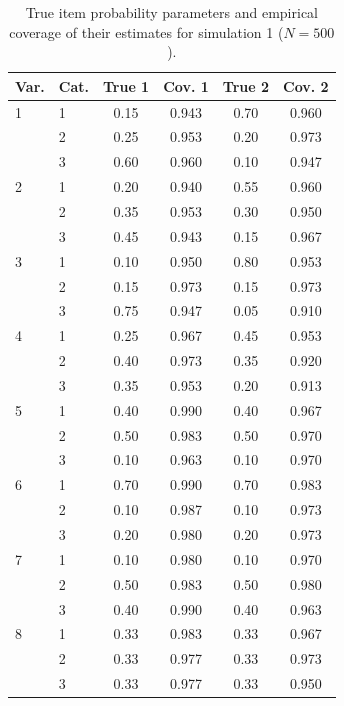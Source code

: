 \begin{table}[H]
\centering
\begin{tabular}{llcccc}
  \toprule
\textbf{Var.} & \textbf{Cat.} & \textbf{True 1} & \textbf{Cov. 1} & \textbf{True 2} & \textbf{Cov. 2} \\ 
  \midrule
1 & 1 & 0.15 & 0.943 & 0.70 & 0.960 \\ 
   & 2 & 0.25 & 0.953 & 0.20 & 0.973 \\ 
   & 3 & 0.60 & 0.960 & 0.10 & 0.947 \\ 
  2 & 1 & 0.20 & 0.940 & 0.55 & 0.960 \\ 
   & 2 & 0.35 & 0.953 & 0.30 & 0.950 \\ 
   & 3 & 0.45 & 0.943 & 0.15 & 0.967 \\ 
  3 & 1 & 0.10 & 0.950 & 0.80 & 0.953 \\ 
   & 2 & 0.15 & 0.973 & 0.15 & 0.973 \\ 
   & 3 & 0.75 & 0.947 & 0.05 & 0.910 \\ 
  4 & 1 & 0.25 & 0.967 & 0.45 & 0.953 \\ 
   & 2 & 0.40 & 0.973 & 0.35 & 0.920 \\ 
   & 3 & 0.35 & 0.953 & 0.20 & 0.913 \\ 
  5 & 1 & 0.40 & 0.990 & 0.40 & 0.967 \\ 
   & 2 & 0.50 & 0.983 & 0.50 & 0.970 \\ 
   & 3 & 0.10 & 0.963 & 0.10 & 0.970 \\ 
  6 & 1 & 0.70 & 0.990 & 0.70 & 0.983 \\ 
   & 2 & 0.10 & 0.987 & 0.10 & 0.973 \\ 
   & 3 & 0.20 & 0.980 & 0.20 & 0.973 \\ 
  7 & 1 & 0.10 & 0.980 & 0.10 & 0.970 \\ 
   & 2 & 0.50 & 0.983 & 0.50 & 0.980 \\ 
   & 3 & 0.40 & 0.990 & 0.40 & 0.963 \\ 
  8 & 1 & 0.33 & 0.983 & 0.33 & 0.967 \\ 
   & 2 & 0.33 & 0.977 & 0.33 & 0.973 \\ 
   & 3 & 0.33 & 0.977 & 0.33 & 0.950 \\ 
   \bottomrule
\end{tabular}
\caption{True item probability parameters and empirical coverage of their estimates for simulation 1 ($N = 500$).} 
\label{table:sim1_item_prob_coverage_N500}
\end{table}
